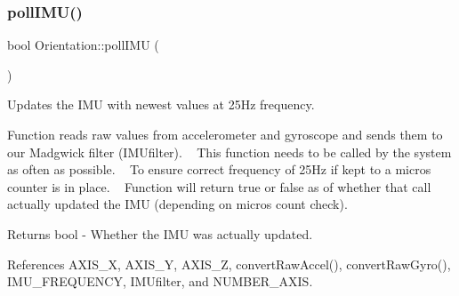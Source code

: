 \subsubsection{\texorpdfstring{poll\+I\+M\+U()}{pollIMU()}}
{\footnotesize\ttfamily bool Orientation\+::poll\+I\+MU (\begin{DoxyParamCaption}{ }\end{DoxyParamCaption})}



Updates the I\+MU with newest values at 25\+Hz frequency. 

Function reads raw values from accelerometer and gyroscope and sends them to our Madgwick filter (I\+M\+Ufilter). ~\newline
This function needs to be called by the system as often as possible. ~\newline
To ensure correct frequency of 25\+Hz if kept to a micros counter is in place. ~\newline
Function will return true or false as of whether that call actually updated the I\+MU (depending on micros count check).

\begin{DoxyReturn}{Returns}
bool -\/ Whether the I\+MU was actually updated. 
\end{DoxyReturn}


References A\+X\+I\+S\+\_\+X, A\+X\+I\+S\+\_\+Y, A\+X\+I\+S\+\_\+Z, convert\+Raw\+Accel(), convert\+Raw\+Gyro(), I\+M\+U\+\_\+\+F\+R\+E\+Q\+U\+E\+N\+CY, I\+M\+Ufilter, and N\+U\+M\+B\+E\+R\+\_\+\+A\+X\+IS.


